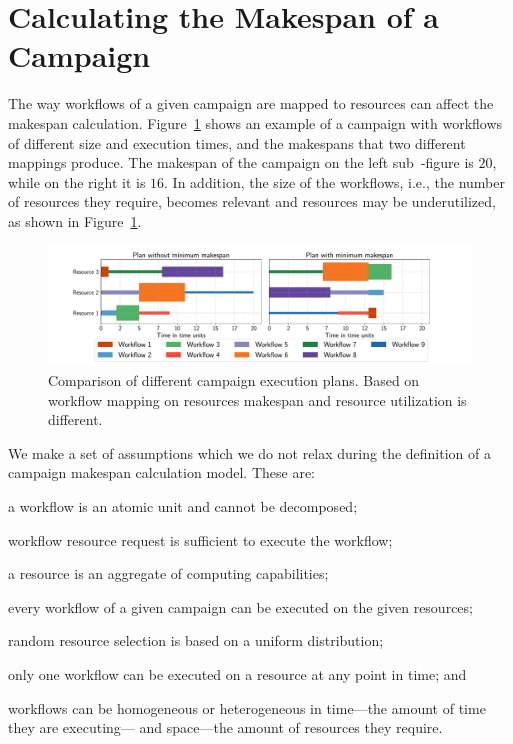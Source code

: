 \section{Calculating the Makespan of a Campaign}
\label{sec:makespan_calc}
The way workflows of a given campaign are mapped to resources can affect the makespan calculation. 
Figure~\ref{fig:example_makespan} shows an example of a campaign with workflows of different size and execution times, and the makespans that two different mappings produce.
The makespan of the campaign on the left sub~-figure is $20$, while on the right it is $16$.
In addition, the size of the workflows, i.e., the number of resources they require, becomes relevant and resources may be underutilized, as shown in Figure~\ref{fig:example_makespan}.

\begin{figure}[ht!]
    \centering
    \includegraphics[width=.99\textwidth]{figures/campaign/plan_comp.pdf}
    \caption{Comparison of different campaign execution plans. Based on workflow mapping on resources makespan and resource utilization is different.}\label{fig:example_makespan}
\end{figure}

We make a set of assumptions which we do not relax during the definition of a campaign makespan calculation model.
These are:
\begin{inparaenum}[(1)]
    \item a workflow is an atomic unit and cannot be decomposed;
    \item workflow resource request is sufficient to execute the workflow;
    \item a resource is an aggregate of computing capabilities;
    \item every workflow of a given campaign can be executed on the given resources;
    \item random resource selection is based on a uniform distribution;
    \item only one workflow can be executed on a resource at any point in time; and
    \item workflows can be homogeneous or heterogeneous in time---the amount of time they are executing--- and space---the amount of resources they require.
\end{inparaenum}

